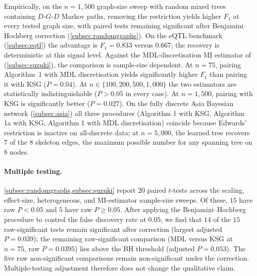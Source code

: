 Empirically, on the $n = 1{,}500$ graph-size sweep with random mixed
trees containing $D$-$G$-$D$ Markov paths, removing the restriction
yields higher $F_1$ at every tested graph size, with paired tests
remaining significant after Benjamini--Hochberg correction
(\cref{subsec:randomgraphs}). On the eQTL benchmark
(\cref{subsec:eqtl}) the advantage is $F_1 = 0.833$ versus
$0.667$; the recovery is deterministic at this signal level. Against the MDL-discretisation MI estimator of
\citet{suzuki2017chow} (\cref{subsec:suzuki}), the comparison is
sample-size dependent. At $n = 75$, pairing Algorithm~1 with MDL
discretisation yields significantly higher $F_1$ than pairing it
with KSG ($P = 0.04$). At $n \in \{100, 200, 500, 1{,}000\}$ the
two estimators are statistically indistinguishable
($P > 0.05$ in every case). At $n = 1{,}500$, pairing with KSG is
significantly better ($P = 0.027$). On the fully discrete Asia
Bayesian network (\cref{subsec:asia}) all three procedures (Algorithm
1 with KSG, Algorithm 1a with KSG, Algorithm 1 with MDL
discretisation) coincide because Edwards' restriction is inactive on
all-discrete data; at $n = 5{,}000$, the learned tree recovers $7$ of
the $8$ skeleton edges, the maximum possible number for any spanning
tree on $8$ nodes.

\paragraph{Multiple testing.} \cref{subsec:randomgraphs,subsec:suzuki}
report $20$ paired $t$-tests across the scaling, effect-size,
heterogeneous, and MI-estimator sample-size sweeps. Of these,
$15$ have raw $P < 0.05$ and $5$ have raw $P \ge 0.05$. After applying
the Benjamini--Hochberg procedure to control the false discovery
rate at $0.05$, we find that $14$ of the $15$ raw-significant
tests remain significant after correction (largest adjusted $P = 0.039$); the
remaining raw-significant comparison (MDL versus KSG at $n = 75$,
raw $P = 0.0395$) lies above the BH threshold (adjusted
$P = 0.053$). The five raw non-significant comparisons remain
non-significant under the correction. Multiple-testing adjustment therefore does not change the
qualitative claim.

